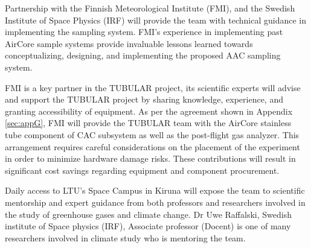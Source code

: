 Partnership with the Finnish Meteorological Institute (FMI), and the Swedish Institute of Space Physics (IRF) will provide the team with technical guidance in implementing the sampling system. FMI’s experience in implementing past AirCore sample systems provide invaluable lessons learned towards conceptualizing, designing, and implementing the proposed AAC sampling system.

FMI is a key partner in the TUBULAR project, its scientific experts will advise and support the TUBULAR project by sharing knowledge, experience, and granting accessibility of equipment. As per the agreement shown in Appendix \ref{sec:appG}, FMI will provide the TUBULAR team with the AirCore stainless tube component of CAC subsystem as well as the post-flight gas analyzer. This arrangement requires careful considerations on the placement of the experiment in order to minimize hardware damage risks. These contributions will result in significant cost savings regarding equipment and component procurement.

Daily access to LTU's Space Campus in Kiruna will expose the team to scientific mentorship and expert guidance from both professors and researchers involved in the study of greenhouse gases and climate change. Dr Uwe Raffalski, Swedish institute of Space physics (IRF), Associate professor (Docent) is one of many researchers involved in climate study who is mentoring the team.